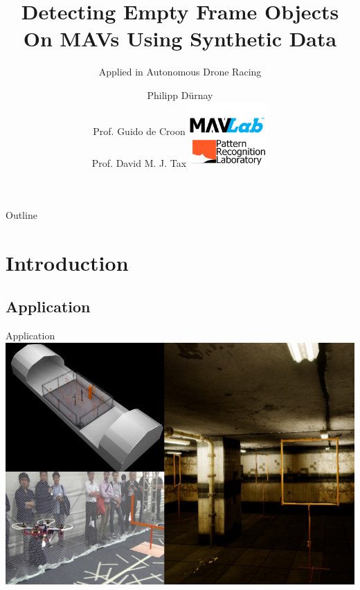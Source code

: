 \documentclass{beamer}
\title{Detecting Empty Frame Objects On MAVs Using Synthetic Data} %
\subtitle{Applied in Autonomous Drone Racing} %
\author{Philipp Dürnay\\ \bigskip \bigskip Prof. Guido de Croon \hfill	\includegraphics[width=3cm]{fig/mavlab}\\
	 Prof. David M. J. Tax  \hfill \includegraphics[width=3cm]{fig/prgroup}%
}
\begin{document}
  \frame{\maketitle}


  \begin{darkframes}
  	\begin{frame}{Outline}
  		\tableofcontents
  	\end{frame}
	\section{Introduction}
	\subsection{Application}
    \begin{frame}{Application}
    	\includegraphics[width=\textwidth]{fig/application}
    \end{frame}


\end{darkframes}
\end{document}
